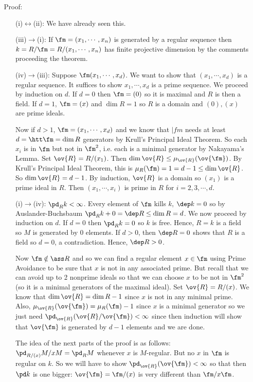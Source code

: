 \noindent Proof: 
\begin{enumerate}
\item[(i)$\leftrightarrow$(ii):] We have already seen this.
\item[(iii)$\to$(i):] If $\fm=(x_1,\cdots,x_n)$ is generated by a regular sequence then $k=R/\fm=R/(x_1,\cdots,x_n)$ has finite projective dimension by the comments proceeding the theorem.
\item[(iv)$\to$(iii):] Suppose $\fm(x_1,\cdots,x_d)$. We want to show that $(x_1,\cdots,x_d)$ is a regular sequence. It suffices to show $x_1,\cdots,x_d$ is a prime sequence. We proceed by induction on $d$. If $d=0$ then $\fm=(0)$ so it is maximal and $R$ is then a field. If $d=1$, $\fm=(x)$ and $\dim R=1$ so $R$ is a domain and $(0),(x)$ are prime ideals. 

Now if $d>1$, $\fm=(x_1,\cdots,x_d)$ and we know that $|fm$ needs at least $d=\htt \fm=\dim R$ generators by Krull's Principal Ideal Theorem. So each $x_i$ is in $\fm$ but not in $\fm^2$, i.e. each is a minimal generator by Nakayama's Lemma. Set $\ov{R}=R/(x_1)$. Then $\dim \ov{R} \leq \mu_{\ov{R}}(\ov{\fm})$. By Krull's Principal Ideal Theorem, this is $\mu_R(\fm)=1=d-1 \leq \dim \ov{R}$. So $\dim \ov{R}=d-1$. By induction, $\ov{R}$ is a domain so $(x_1)$ is a prime ideal in $R$. Then $(x_1,\cdots,x_i)$ is prime in $R$ for $i=2,3,\cdots,d$. 

\item[(i)$\to$(iv):] $\pd_R k <\infty$. Every element of $\fm$ kills $k$, $\dep k=0$ so by Auslander-Buchsbaum $\pd_R k+0=\dep R \leq \dim R=d$. We now proceed by induction on $d$. If $d=0$ then $\pd_R k=0$ so $k$ is free. Hence, $R=k$ is a field so $M$ is generated by $0$ elements. If $d>0$, then $\dep R=0$ shows that $R$ is a field so $d=0$, a contradiction. Hence, $\dep R>0$. 

Now $\fm \notin \ass R$ and so we can find a regular element $x \in \fm$ using Prime Avoidance to be sure that $x$ is not in any associated prime. But recall that we can avoid up to 2 nonprime ideals so that we can choose $x$ to be not in $\fm^2$ (so it is a minimal generators of the maximal ideal). Set $\ov{R}=R/(x)$. We know that $\dim \ov{R}=\dim R-1$ since $x$ is not in any minimal prime. Also, $\mu_{\ov{R}}(\ov{\fm})=\mu_R(\fm)-1$ since $x$ is a minimal generator so we just need $\pd_{\ov{R}}(\ov{R}/\ov{\fm})<\infty$ since then induction will show that $\ov{\fm}$ is generated by $d-1$ elements and we are done. 

The idea of the next parts of the proof is as follows: $\pd_{R/(x)} M/xM=\pd_R M$ whenever $x$ is $M$-regular. But no $x$ in $\fm$ is regular on $k$. So we will have to show $\pd_{\ov{R}}(\ov{\fm})<\infty$ so that then $\pd k$ is one bigger: $\ov{\fm}=\fm/(x)$ is very different than $\fm/x\fm$. 


\end{enumerate}
